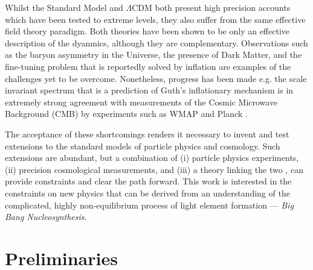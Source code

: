 \documentclass[11pt]{article}
\numberwithin{equation}{section}
\numberwithin{figure}{section}
\numberwithin{table}{section}
\begin{document}
Whilst the Standard Model and $\Lambda$CDM both present high precision accounts which have been tested to extreme levels, they also suffer from the same effective field theory paradigm. Both theories have been shown to be only an effective description of the dyanmics, although they are complementary. Observations such as the baryon asymmetry in the Universe, the presence of Dark Matter, and the fine-tuning problem that is reportedly solved by inflation \citep{Guth:1980zm} are examples of the challenges yet to be overcome. Nonetheless, progress has been made e.g. the scale invariant spectrum that is a prediction of Guth's inflationary mechanism \citep{Mukhanov:1990me} is in extremely strong agreement with measurements of the Cosmic Microwave Background (CMB) by experiments such as WMAP \citep{Bennett:2003ba} and Planck \citep{Villa:2001ss}.

The acceptance of these shortcomings renders it necessary to invent and test extensions to the standard models of particle physics and cosmology. Such extensions are abundant, but a combination of (i) particle physics experiments, (ii) precision cosmological measurements, and (iii) a theory linking the two \citep{Kolb:1990vq}, can provide constraints and clear the path forward. This work is interested in the constraints on new physics that can be derived from an understanding of the complicated, highly non-equilibrium process \citep{Ellis:1979nq} of light element formation --- \textit{Big Bang Nucleosynthesis}.


\section{Preliminaries} \label{sec:prelims}
\end{document}
